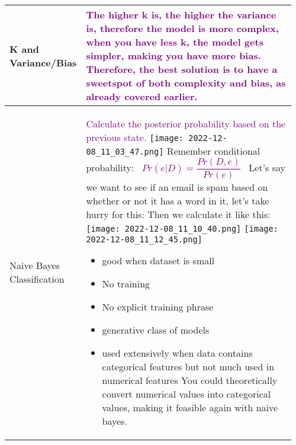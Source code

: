 \documentclass[main.tex,fontsize=8pt,paper=a4,paper=portrait,DIV=calc,]{scrartcl}
\begin{document}
\begin{table}[ht!]
\begin{tabular}{|m{0.2\linewidth}|m{0.755\linewidth}|}
\hline
K and Variance/Bias & 
\textcolor{purple}{\textbf{The higher k} is, the \textbf{higher the variance} is, therefore the \textbf{model is more complex}, when you have \textbf{less k, the model gets simpler}, making you have \textbf{more bias}.\newline
Therefore, the best solution is to have a sweetspot of both complexity and bias, as already covered earlier.}
\\
\hline
Naive Bayes Classification & 
\textcolor{purple}{Calculate the posterior probability based on the previous state.}\newline
\texttt{[image: 2022-12-08\_11\_03\_47.png]}\newline
Remember conditional probability:\newline
\, \newline
\large \textcolor{purple}{\( Pr(e | D) = \dfrac{Pr(D,e)}{Pr(e)} \)}\newline
\normalsize \, \newline
Let's say we want to see if an email is spam based on whether or not it has a word in it, let's take hurry for this:\newline
Then we calculate it like this:\newline
\texttt{[image: 2022-12-08\_11\_10\_40.png]}\newline
\texttt{[image: 2022-12-08\_11\_12\_45.png]}\newline
\begin{itemize}
\item \textcolor{OliveGreen}{good when dataset is small}
\item \textcolor{OliveGreen}{No training}
\item \textcolor{OliveGreen}{No explicit training phrase}
\item \textcolor{OliveGreen}{generative class of models}
\item \textcolor{OliveGreen}{used extensively when data contains categorical features but not much used in numerical features}\newline
You could theoretically convert numerical values into categorical values, making it feasible again with naive bayes.
\vspace{-3mm}
\end{itemize} 
\\
\hline
\end{tabular}

\end{table}
\end{document}
